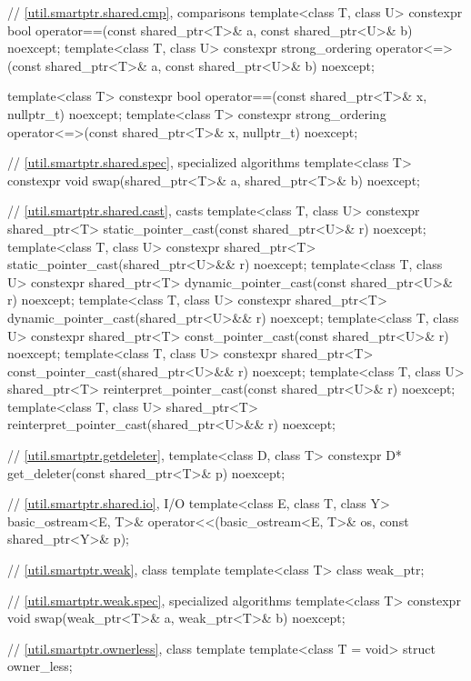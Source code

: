 \begin{codeblock}
{  // \ref{util.smartptr.shared.cmp},  comparisons
  template<class T, class U>
    constexpr bool operator==(const shared_ptr<T>& a, const shared_ptr<U>& b) noexcept;
  template<class T, class U>
    constexpr strong_ordering operator<=>(const shared_ptr<T>& a,
                                          const shared_ptr<U>& b) noexcept;

  template<class T>
    constexpr bool operator==(const shared_ptr<T>& x, nullptr_t) noexcept;
  template<class T>
    constexpr strong_ordering operator<=>(const shared_ptr<T>& x, nullptr_t) noexcept;

  // \ref{util.smartptr.shared.spec},  specialized algorithms
  template<class T>
    constexpr void swap(shared_ptr<T>& a, shared_ptr<T>& b) noexcept;

  // \ref{util.smartptr.shared.cast},  casts
  template<class T, class U>
    constexpr shared_ptr<T> static_pointer_cast(const shared_ptr<U>& r) noexcept;
  template<class T, class U>
    constexpr shared_ptr<T> static_pointer_cast(shared_ptr<U>&& r) noexcept;
  template<class T, class U>
    constexpr shared_ptr<T> dynamic_pointer_cast(const shared_ptr<U>& r) noexcept;
  template<class T, class U>
    constexpr shared_ptr<T> dynamic_pointer_cast(shared_ptr<U>&& r) noexcept;
  template<class T, class U>
    constexpr shared_ptr<T> const_pointer_cast(const shared_ptr<U>& r) noexcept;
  template<class T, class U>
    constexpr shared_ptr<T> const_pointer_cast(shared_ptr<U>&& r) noexcept;
  template<class T, class U>
    shared_ptr<T> reinterpret_pointer_cast(const shared_ptr<U>& r) noexcept;
  template<class T, class U>
    shared_ptr<T> reinterpret_pointer_cast(shared_ptr<U>&& r) noexcept;

  // \ref{util.smartptr.getdeleter},  
  template<class D, class T>
    constexpr D* get_deleter(const shared_ptr<T>& p) noexcept;

  // \ref{util.smartptr.shared.io},  I/O
  template<class E, class T, class Y>
    basic_ostream<E, T>& operator<<(basic_ostream<E, T>& os, const shared_ptr<Y>& p);

  // \ref{util.smartptr.weak}, class template 
  template<class T> class weak_ptr;

  // \ref{util.smartptr.weak.spec},  specialized algorithms
  template<class T> constexpr void swap(weak_ptr<T>& a, weak_ptr<T>& b) noexcept;

  // \ref{util.smartptr.ownerless}, class template 
  template<class T = void> struct owner_less;

}
\end{codeblock}

